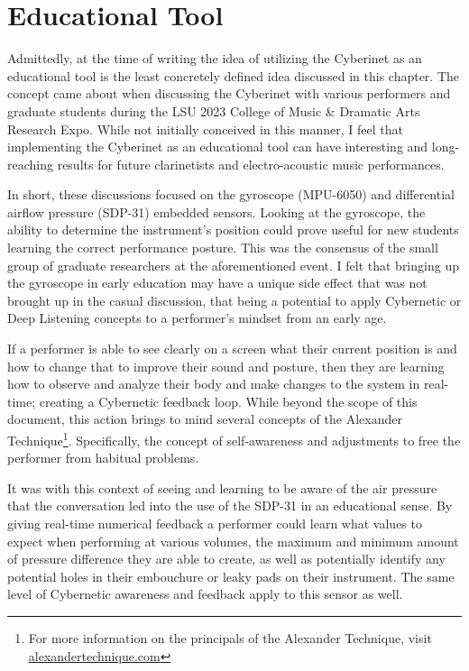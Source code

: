 \section{Educational Tool}
Admittedly, at the time of writing the idea of utilizing the Cyberinet as an educational tool is the least concretely defined idea discussed in this chapter. The concept came about when discussing the Cyberinet with various performers and graduate students during the LSU 2023 College of Music \& Dramatic Arts Research Expo. While not initially conceived in this manner, I feel that implementing the Cyberinet as an educational tool can have interesting and long-reaching results for future clarinetists and electro-acoustic music performances. 

In short, these discussions focused on the gyroscope (MPU-6050) and differential airflow pressure (SDP-31) embedded sensors. Looking at the gyroscope, the ability to determine the instrument's position could prove useful for new students learning the correct performance posture. This was the consensus of the small group of graduate researchers at the aforementioned event. I felt that bringing up the gyroscope in early education may have a unique side effect that was not brought up in the casual discussion, that being a potential to apply Cybernetic or Deep Listening concepts to a performer's mindset from an early age.

If a performer is able to see clearly on a screen what their current position is and how to change that to improve their sound and posture, then they are learning how to observe and analyze their body and make changes to the system in real-time; creating a Cybernetic feedback loop\cite{WeinerCybernetics2019}. While beyond the scope of this document, this action brings to mind several concepts of the Alexander Technique\footnote{For more information on the principals of the Alexander Technique, visit \url{alexandertechnique.com}}. Specifically, the concept of self-awareness and adjustments to free the performer from habitual problems\cite{gelbBodyLearning2013}.

It was with this context of seeing and learning to be aware of the air pressure that the conversation led into the use of the SDP-31 in an educational sense. By giving real-time numerical feedback a performer could learn what values to expect when performing at various volumes, the maximum and minimum amount of pressure difference they are able to create, as well as potentially identify any potential holes in their embouchure or leaky pads on their instrument. The same level of Cybernetic awareness and feedback apply to this sensor as well.

